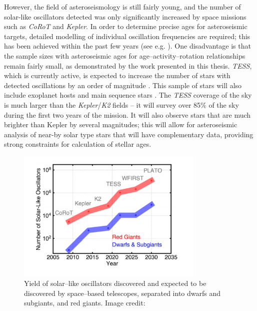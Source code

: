 However, the field of asteroseismology is still fairly young, and the number of solar-like oscillators detected was only significantly increased by space missions such as \textit{CoRoT} and \textit{Kepler}. In order to determine precise ages for asteroseismic targets, detailed modelling of individual oscillation frequencies are required; this has been achieved within the past few years (see e.g. \citealt{Silva_Aguirre_etal_2017}). One disadvantage is that the sample sizes with asteroseismic ages for age--activity--rotation relationships remain fairly small, as demonstrated by the work presented in this thesis. \textit{TESS}, which is currently active, is expected to increase the number of stars with detected oscillations by an order of magnitude \citep{Schofield_etal_2019}. This sample of stars will also include exoplanet hosts and main sequence stars \citep{Campante_etal_2016}. The \textit{TESS} coverage of the sky is much larger than the \textit{Kepler}/\textit{K2} fields -- it will survey over 85\% of the sky during the first two years of the mission. It will also observe stars that are much brighter than Kepler by several magnitudes; this will allow for asteroseismic analysis of near-by solar type stars that will have complementary data, providing strong constraints for calculation of stellar ages.

\begin{figure}
    \centering
    \includegraphics[width=0.8\textwidth]{Figures/number_of_stellar_ages.pdf}
    \caption[Expected yield of solar--like oscillators with current and future telescopes]{Yield of solar--like oscillators discovered and expected to be discovered by space--based telescopes, separated into dwarfs and subgiants, and red giants. Image credit: \citet{Huber_etal_2019_white_paper}}
    \label{fig:number_of_stellar_ages}
\end{figure}

